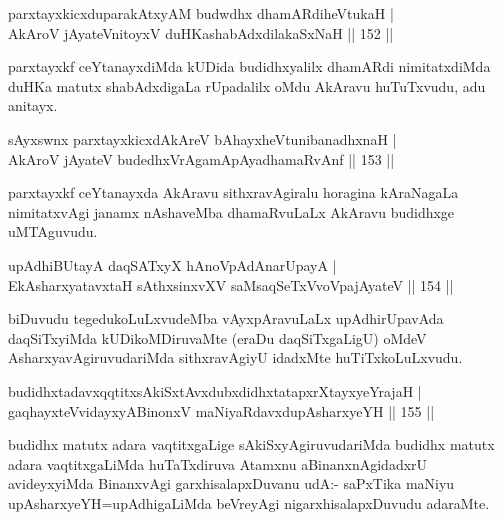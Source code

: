 \begin{shl}
parxtayxkicxduparakAtxyAM budwdhx dhamARdiheVtukaH |\\
AkAroV jAyateV\s nitoyxV duHKashabAdxdilakaSxNaH \hfill || 152 ||
\end{shl}

\begin{artha}%
parxtayxkf ceYtanayxdiMda kUDida budidhxyalilx dhamARdi nimitatxdiMda duHKa matutx shabAdxdigaLa rUpadalilx oMdu AkAravu huTuTxvudu, adu anitayx.
\end{artha}

\begin{shl}
sAyxswnx parxtayxkicxdAkAreV bAhayxheVtunibanadhxnaH |\\
AkAroV jAyateV budedhxVrAgamApAyadhamaRvAnf \hfill || 153 ||
\end{shl}

\begin{artha}
parxtayxkf ceYtanayxda AkAravu sithxravAgiralu horagina kAraNagaLa nimitatxvAgi janamx nAshaveMba dhamaRvuLaLx AkAravu budidhxge uMTAguvudu.
\end{artha}


\begin{shl}
upAdhiBUtayA daqSATxyX hAnoVpAdAnarUpayA |\\
EkAsharxyatavxtaH sAthxsinxvXV saMsaqSeTxVvoVpajAyateV \hfill || 154 ||
\end{shl}

\begin{artha}
biDuvudu tegedukoLuLxvudeMba vAyxpAravuLaLx upAdhirUpavAda daqSiTxyiMda kUDikoMDiruvaMte (eraDu daqSiTxgaLigU) oMdeV AsharxyavAgiruvudariMda sithxravAgiyU idadxMte huTiTxkoLuLxvudu.
\end{artha}


\begin{shl}
budidhxtadavxqqtitxsAkiSxtAvxdubxdidhxtatapxrXtayxyeYrajaH |\\
gaqhayxteV\s vidayxyA\s BinonxV maNiyaRdavxdupAsharxyeYH \hfill || 155 ||
\end{shl}

\begin{artha}
budidhx matutx adara vaqtitxgaLige sAkiSxyAgiruvudariMda budidhx matutx adara vaqtitxgaLiMda huTaTxdiruva Atamxnu aBinanxnAgidadxrU avideyxyiMda BinanxvAgi garxhisalapxDuvanu udA:- saPxTika maNiyu upAsharxyeYH=upAdhigaLiMda beVreyAgi nigarxhisalapxDuvudu adaraMte.
\end{artha}%

